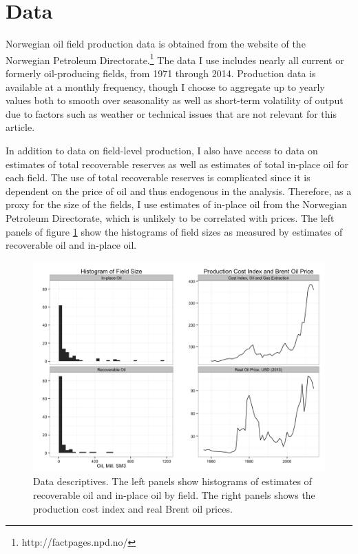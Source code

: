 \documentclass[11pt]{article}
\begin{document}
\section{Data}
Norwegian oil field production data is obtained from the website of the Norwegian Petroleum Directorate.\footnote{http://factpages.npd.no/} The data I use includes nearly all current or formerly oil-producing fields, from 1971 through 2014. Production data is available at a monthly frequency, though I choose to aggregate up to yearly values both to smooth over seasonality as well as short-term volatility of output due to factors such as weather or technical issues that are not relevant for this article. 

In addition to data on field-level production, I also have access to data on estimates of total recoverable reserves as well as estimates of total in-place oil for each field. The use of total recoverable reserves is complicated since it is dependent on the price of oil and thus endogenous in the analysis.  Therefore, as a proxy for the size of the fields, I use estimates of in-place oil from the Norwegian Petroleum Directorate, which is unlikely to be correlated with prices. The left panels of figure \ref{data_descriptives} show the histograms of field sizes as measured by estimates of recoverable oil and in-place oil. 

\begin{figure}
	\includegraphics[width=1\textwidth]{figures/data_descriptives.png}
	\caption{Data descriptives. The left panels show histograms of estimates of recoverable oil and in-place oil by field. The right panels shows the production cost index and real Brent oil prices.}
	\label{data_descriptives}
\end{figure}
\end{document}
